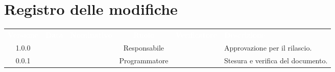 \section*{Registro delle modifiche}
{
\renewcommand{\arraystretch}{1.5}
\centering
\begin{longtable}{ c c  C{2.3cm} c C{3cm} C{3.2cm}}
\textcolor{white}{\textbf{Versione}} & \textcolor{white}{\textbf{Data}} & \textcolor{white}{\textbf{Nominativo}} & \textcolor{white}{\textbf{Ruolo}} & 
\textcolor{white}{\textbf{Verificatore}}& \textcolor{white}{\textbf{Descrizione}}\\	


1.0.0 & \Data{} & \PF{} & Responsabile & \MC{} & Approvazione per il rilascio.  \\
		
0.0.1 & \Data{} & \BR{} & Programmatore & \MC{} & Stesura e verifica del documento.  \\
		
		
\end{longtable}
}